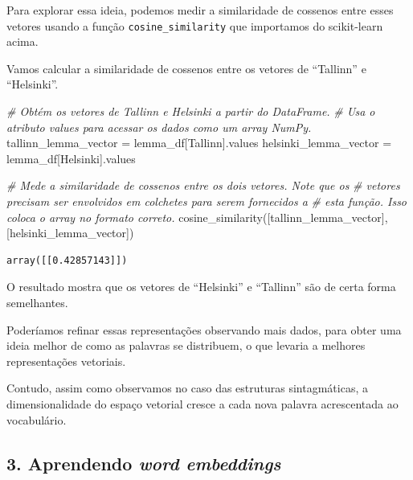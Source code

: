 \documentclass[
  brazilian,
]{article}
\newenvironment{Shaded}{}{}
\newcommand{\CommentTok}[1]{\textcolor[rgb]{0.38,0.63,0.69}{\textit{#1}}}
\newcommand{\NormalTok}[1]{#1}
\newcommand{\OperatorTok}[1]{\textcolor[rgb]{0.40,0.40,0.40}{#1}}
\newcommand{\StringTok}[1]{\textcolor[rgb]{0.25,0.44,0.63}{#1}}
\begin{document}
Para explorar essa ideia, podemos medir a similaridade de cossenos entre
esses vetores usando a função \texttt{cosine\_similarity} que importamos
do scikit-learn acima.

Vamos calcular a similaridade de cossenos entre os vetores de
``Tallinn'' e ``Helsinki''.

\begin{Shaded}
\begin{Highlighting}[]
\CommentTok{\# Obtém os vetores de \textquotesingle{}Tallinn\textquotesingle{} e \textquotesingle{}Helsinki\textquotesingle{} a partir do DataFrame.}
\CommentTok{\# Usa o atributo \textquotesingle{}values\textquotesingle{} para acessar os dados como um array NumPy.}
\NormalTok{tallinn\_lemma\_vector }\OperatorTok{=}\NormalTok{ lemma\_df[}\StringTok{\textquotesingle{}Tallinn\textquotesingle{}}\NormalTok{].values}
\NormalTok{helsinki\_lemma\_vector }\OperatorTok{=}\NormalTok{ lemma\_df[}\StringTok{\textquotesingle{}Helsinki\textquotesingle{}}\NormalTok{].values}

\CommentTok{\# Mede a similaridade de cossenos entre os dois vetores. Note que os}
\CommentTok{\# vetores precisam ser envolvidos em colchetes para serem fornecidos a}
\CommentTok{\# esta função. Isso coloca o array no \textquotesingle{}formato\textquotesingle{} correto.}
\NormalTok{cosine\_similarity([tallinn\_lemma\_vector], [helsinki\_lemma\_vector])}
\end{Highlighting}
\end{Shaded}

\begin{verbatim}
array([[0.42857143]])
\end{verbatim}

O resultado mostra que os vetores de ``Helsinki'' e ``Tallinn'' são de
certa forma semelhantes.

Poderíamos refinar essas representações observando mais dados, para
obter uma ideia melhor de como as palavras se distribuem, o que levaria
a melhores representações vetoriais.

Contudo, assim como observamos no caso das estruturas sintagmáticas, a
dimensionalidade do espaço vetorial cresce a cada nova palavra
acrescentada ao vocabulário.

\hypertarget{aprendendo-word-embeddings}{%
\subsection{\texorpdfstring{3. Aprendendo \emph{word
embeddings}}{3. Aprendendo word embeddings}}\label{aprendendo-word-embeddings}}
\end{document}
